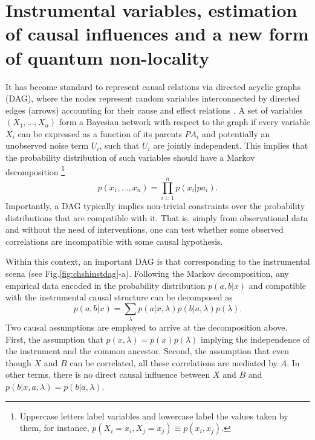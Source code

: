 \documentclass[letterpaper]{article}
\begin{document}
\section*{Instrumental variables, estimation of causal influences and a new form of quantum non-locality}

It has become standard to represent causal relations via directed acyclic graphs (DAG), where the nodes represent random variables interconnected by directed edges (arrows) accounting for their cause and effect relations \cite{pearlbook}. A set of variables  $\left( X_1,\dots, X_n \right)$ form a Bayesian network with respect to the graph if every variable $X_i$ can be expressed as a function of its parents $PA_i$ and potentially an unobserved noise term $U_i$, such that $U_i$ are jointly independent. This implies that the probability distribution of such variables should have a Markov decomposition \footnote{Uppercase letters label variables and lowercase label the values taken by them, for instance, $p(X_i =x_i
, X_j = x_j) ≡ p(x_i, x_j)$.}
\begin{equation}
p(x_1,\dots,x_n)= \prod_{i=1}^{n} p(x_i \vert pa_i).    
\end{equation}
Importantly, a DAG typically implies non-trivial constraints over the probability distributions that are compatible with it. That is, simply from observational data and without the need of interventions, one can test whether some observed correlations are incompatible with some causal hypothesis.


Within this context, an important DAG is that corresponding to the instrumental scena (see Fig.\ref{fig:chshinstdag}-a). Following the Markov decomposition, any empirical data encoded in the probability distribution $p(a,b \vert x)$ and compatible with the instrumental causal structure can be decomposed as
\begin{equation}
p(a,b \vert x) = \sum_{\lambda} p(a\vert x,\lambda) p(b\vert a,\lambda)p(\lambda).
\end{equation}
Two causal assumptions are employed to arrive at the decomposition above. First, the assumption that $p(x,\lambda)=p(x)p(\lambda)$ implying the independence of the instrument and the common ancestor. Second, the assumption that even though $X$ and $B$ can be correlated, all these correlations are mediated by $A$. In other terms, there is no direct causal influence between $X$ and $B$ and  $p(b\vert x,a,\lambda)=p(b\vert a,\lambda)$.
\end{document}
